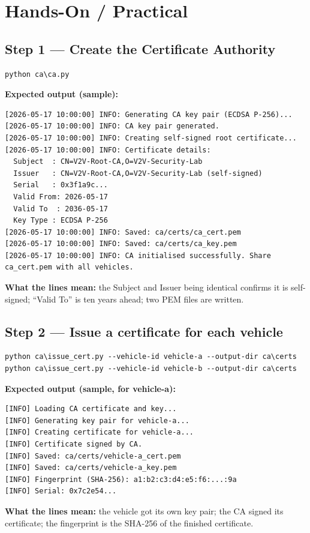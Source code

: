 \documentclass[11pt,a4paper]{article}
\begin{document}
\section{Hands-On / Practical}

\subsection{Step 1 --- Create the Certificate Authority}
\begin{lstlisting}[style=term]
python ca\ca.py
\end{lstlisting}
\textbf{Expected output (sample):}
\begin{lstlisting}[style=term]
[2026-05-17 10:00:00] INFO: Generating CA key pair (ECDSA P-256)...
[2026-05-17 10:00:00] INFO: CA key pair generated.
[2026-05-17 10:00:00] INFO: Creating self-signed root certificate...
[2026-05-17 10:00:00] INFO: Certificate details:
  Subject  : CN=V2V-Root-CA,O=V2V-Security-Lab
  Issuer   : CN=V2V-Root-CA,O=V2V-Security-Lab (self-signed)
  Serial   : 0x3f1a9c...
  Valid From: 2026-05-17
  Valid To  : 2036-05-17
  Key Type : ECDSA P-256
[2026-05-17 10:00:00] INFO: Saved: ca/certs/ca_cert.pem
[2026-05-17 10:00:00] INFO: Saved: ca/certs/ca_key.pem
[2026-05-17 10:00:00] INFO: CA initialised successfully. Share ca_cert.pem with all vehicles.
\end{lstlisting}
\textbf{What the lines mean:} the Subject and Issuer being identical confirms it
is self-signed; ``Valid To'' is ten years ahead; two PEM files are written.

\subsection{Step 2 --- Issue a certificate for each vehicle}
\begin{lstlisting}[style=term]
python ca\issue_cert.py --vehicle-id vehicle-a --output-dir ca\certs
python ca\issue_cert.py --vehicle-id vehicle-b --output-dir ca\certs
\end{lstlisting}
\textbf{Expected output (sample, for vehicle-a):}
\begin{lstlisting}[style=term]
[INFO] Loading CA certificate and key...
[INFO] Generating key pair for vehicle-a...
[INFO] Creating certificate for vehicle-a...
[INFO] Certificate signed by CA.
[INFO] Saved: ca/certs/vehicle-a_cert.pem
[INFO] Saved: ca/certs/vehicle-a_key.pem
[INFO] Fingerprint (SHA-256): a1:b2:c3:d4:e5:f6:...:9a
[INFO] Serial: 0x7c2e54...
\end{lstlisting}
\textbf{What the lines mean:} the vehicle got its own key pair; the CA signed its
certificate; the fingerprint is the SHA-256 of the finished certificate.
\end{document}
